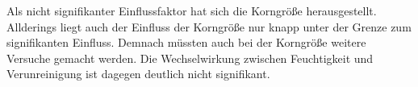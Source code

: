     \noindent
    Als nicht signifikanter Einflussfaktor hat sich die Korngröße herausgestellt. Allderings
    liegt auch der Einfluss der Korngröße nur knapp unter der Grenze zum signifikanten
    Einfluss. Demnach müssten auch bei der Korngröße weitere Versuche gemacht werden.
    Die Wechselwirkung zwischen Feuchtigkeit und Verunreinigung ist dagegen deutlich nicht
    signifikant.